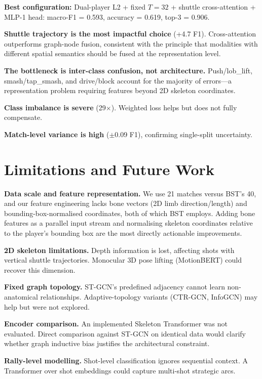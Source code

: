 \documentclass[11pt,a4paper]{article}
\begin{document}
\textbf{Best configuration:} Dual-player L2 + fixed $T=32$ + shuttle cross-attention + MLP-1 head: macro-F1 = 0.593, accuracy = 0.619, top-3 = 0.906.

\textbf{Shuttle trajectory is the most impactful choice} (+4.7 F1). Cross-attention outperforms graph-node fusion, consistent with the principle that modalities with different spatial semantics should be fused at the representation level.

\textbf{The bottleneck is inter-class confusion, not architecture.} Push/lob\_lift, smash/tap\_smash, and drive/block account for the majority of errors---a representation problem requiring features beyond 2D skeleton coordinates.

\textbf{Class imbalance is severe} (29$\times$). Weighted loss helps but does not fully compensate.

\textbf{Match-level variance is high} ($\pm$0.09 F1), confirming single-split uncertainty.

\section{Limitations and Future Work}

\textbf{Data scale and feature representation.} We use 21 matches versus BST's 40, and our feature engineering lacks bone vectors (2D limb direction/length) and bounding-box-normalised coordinates, both of which BST employs. Adding bone features as a parallel input stream and normalising skeleton coordinates relative to the player's bounding box are the most directly actionable improvements.

\textbf{2D skeleton limitations.} Depth information is lost, affecting shots with vertical shuttle trajectories. Monocular 3D pose lifting (MotionBERT) could recover this dimension.

\textbf{Fixed graph topology.} ST-GCN's predefined adjacency cannot learn non-anatomical relationships. Adaptive-topology variants (CTR-GCN, InfoGCN) may help but were not explored.

\textbf{Encoder comparison.} An implemented Skeleton Transformer was not evaluated. Direct comparison against ST-GCN on identical data would clarify whether graph inductive bias justifies the architectural constraint.

\textbf{Rally-level modelling.} Shot-level classification ignores sequential context. A Transformer over shot embeddings could capture multi-shot strategic arcs.
\end{document}
